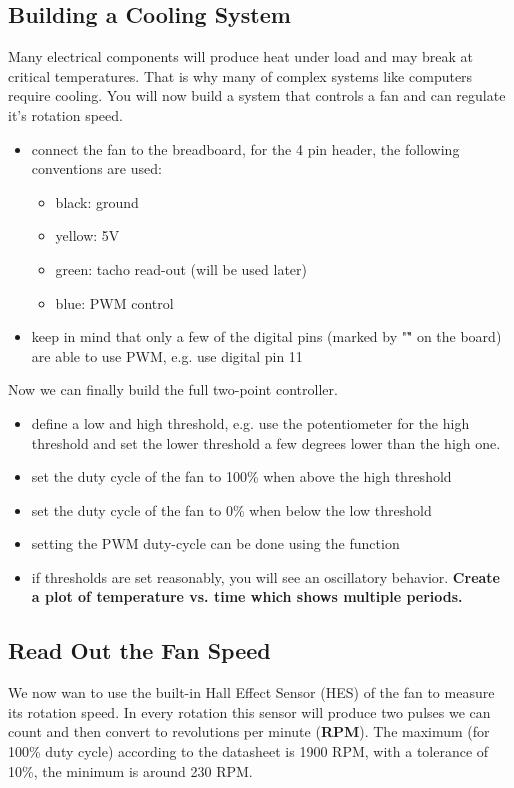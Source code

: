 \subsection{Building a Cooling System}\label{sec:cool}
Many electrical components will produce heat under load and may break at critical temperatures. That is why many of complex systems like computers require cooling. You will now build a system that controls a fan and can regulate it's rotation speed.
\begin{itemize}
	\item connect the fan to the breadboard, for the 4 pin header, the following conventions are used:
	\begin{itemize}
	    \item black: ground
	    \item yellow: 5V
	    \item green: tacho read-out (will be used later)
	    \item blue: PWM control
	\end{itemize}
	\item keep in mind that only a few of the digital pins (marked by "\~" on the board) are able to use PWM, e.g. use digital pin 11
\end{itemize}
Now we can finally build the full two-point controller.
\begin{itemize}
    \item define a low and high threshold, e.g. use the potentiometer for the high threshold and set the lower threshold a few degrees lower than the high one.
	\item set the duty cycle of the fan to 100\% when above the high threshold
	\item set the duty cycle of the fan to 0\% when below the low threshold
	\item setting the PWM duty-cycle can be done using the  function
	\item if thresholds are set reasonably, you will see an oscillatory behavior. \textbf{Create a plot of temperature vs. time which shows multiple periods.}
\end{itemize}


\subsection{Read Out the Fan Speed}
We now wan to use the built-in Hall Effect Sensor (HES) of the fan to measure its rotation speed. In every rotation this sensor will produce two pulses we can count and then convert to revolutions per minute (\textbf{RPM}). The maximum (for 100\% duty cycle) according to the datasheet is 1900 RPM, with a tolerance of 10\%, the minimum is around 230 RPM.

